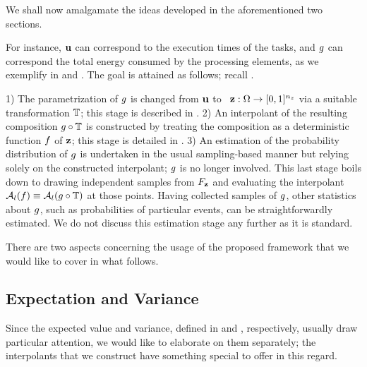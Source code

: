  We shall now amalgamate the ideas developed in
the aforementioned two sections.

 For instance, $\mathbf{u}$ can correspond
to the execution times of the tasks, and $g$ can correspond the total energy
consumed by the processing elements, as we exemplify in  and
. The goal is attained as follows; recall .

1) The parametrization of $g$ is changed from $\mathbf{u}$ to \rvs\ $\mathbf{z}: \Omega
\to [0, 1]^{n_z}$ via a suitable transformation $\mathbb{T}$; this stage is
described in . 2) An interpolant of the resulting composition
$g \circ \mathbb{T}$ is constructed by treating the composition as a
deterministic function $f$ of $\mathbf{z}$; this stage is detailed in
. 3) An estimation of the probability distribution of $g$
is undertaken in the usual sampling-based manner but relying solely on the
constructed interpolant; $g$ is no longer involved. This last stage boils down
to drawing independent samples from $F_{\mathbf{z}}$ and evaluating the
interpolant $\mathcal{A}_{l}(f) \equiv \mathcal{A}_{l}(g \circ
\mathbb{T})$ at those points. Having collected samples of $g$, other
statistics about $g$, such as probabilities of particular events, can be
straightforwardly estimated. We do not discuss this estimation stage any further
as it is standard.

There are two aspects concerning the usage of the proposed framework that we
would like to cover in what follows.

\subsection{Expectation and Variance} 
Since the expected value and variance, defined in  and
, respectively, usually draw particular attention, we would like
to elaborate on them separately; the interpolants that we construct have
something special to offer in this regard.

